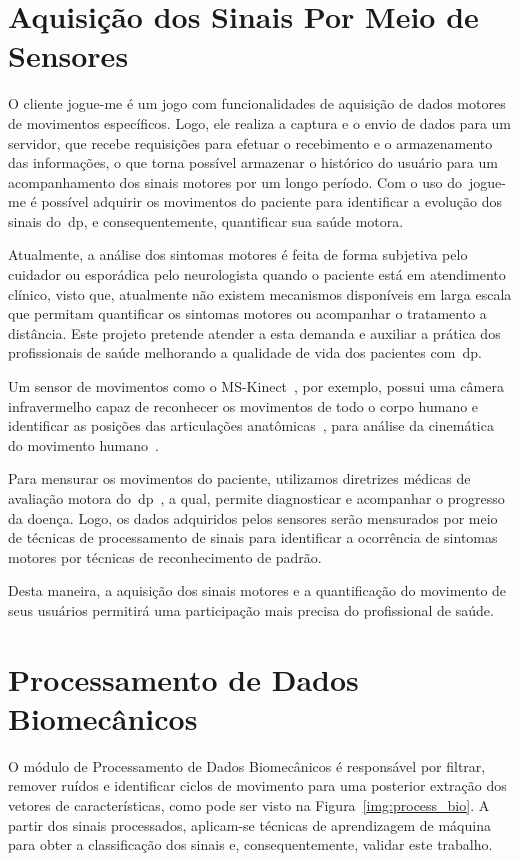 \section{Aquisição dos Sinais Por Meio de Sensores}


O cliente \ac{jogue-me} é um jogo com funcionalidades de aquisição de dados motores de movimentos específicos. Logo, ele realiza a captura e o envio de dados para um servidor, que recebe requisições para efetuar o recebimento e o armazenamento das informações, o que torna possível armazenar o histórico do usuário para um acompanhamento dos sinais motores por um longo período. Com o uso do~\ac{jogue-me} é possível adquirir os movimentos do paciente para identificar a evolução dos sinais do~\ac{dp}, e consequentemente, quantificar sua saúde motora. 

Atualmente, a análise dos sintomas motores é feita de forma subjetiva pelo cuidador ou esporádica pelo neurologista quando o paciente está em atendimento clínico, visto que, atualmente não existem mecanismos disponíveis em larga escala que permitam quantificar os sintomas motores ou acompanhar o tratamento a distância. Este projeto pretende atender a esta demanda e auxiliar a prática dos profissionais de saúde melhorando a qualidade de vida dos pacientes com~\ac{dp}.

Um sensor de movimentos como o MS-Kinect~\cite{kinnect2013}, por exemplo, possui uma câmera infravermelho capaz de reconhecer os movimentos de todo o corpo humano e identificar as posições das articulações anatômicas~\cite{hamill1999bases}, para análise da cinemática do movimento humano~\cite{mcginnis2013biomechanics}. 

Para mensurar os movimentos do paciente, utilizamos diretrizes médicas de avaliação motora do~\ac{dp}~\cite{updrs87}, a qual, permite diagnosticar e acompanhar o progresso da doença. Logo, os dados adquiridos pelos sensores serão mensurados por meio de técnicas de processamento de sinais para identificar a ocorrência de sintomas motores por técnicas de reconhecimento de padrão. 

Desta maneira, a aquisição dos sinais motores e a quantificação do movimento de seus usuários permitirá uma participação mais precisa do profissional de saúde.


\section{Processamento de Dados Biomecânicos}\label{sec:processador_bio}
O módulo de Processamento de Dados Biomecânicos é responsável por filtrar, remover ruídos e identificar ciclos de movimento para uma posterior extração dos vetores de características, como pode ser visto na Figura~\ref{img:process_bio}. A partir dos sinais processados, aplicam-se técnicas de aprendizagem de máquina para obter a classificação dos sinais e, consequentemente, validar este trabalho.

